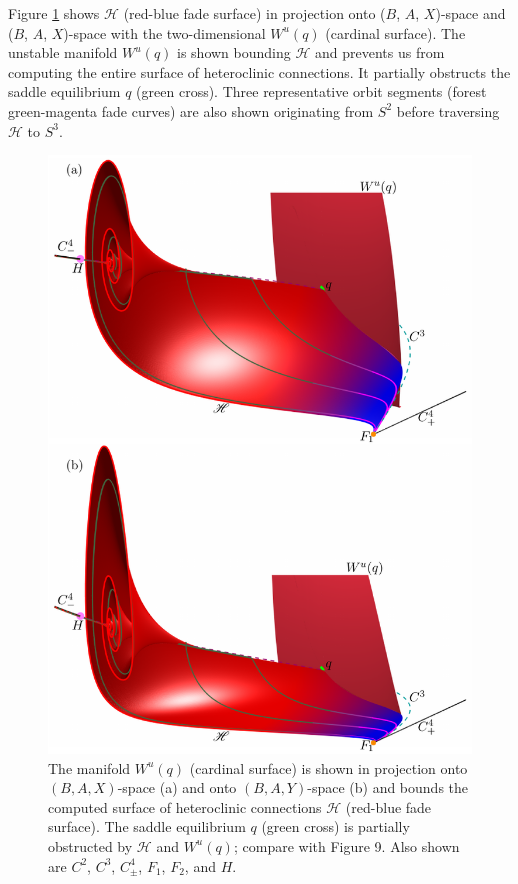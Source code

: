\documentclass{ws-ijbc}
\begin{document}
Figure \ref{figure_10} shows $\mathscr{H}$ (red-blue fade surface) in projection onto ($B$, $A$, $X$)-space and ($B$, $A$, $X$)-space with the two-dimensional $W^u(q)$ (cardinal surface).  The unstable manifold $W^u(q)$ is shown bounding $\mathscr{H}$ and prevents us from computing the entire surface of heteroclinic connections.  It partially obstructs the saddle equilibrium $q$ (green cross).  Three representative orbit segments (forest green-magenta fade curves) are also shown originating from $S^2$ before traversing $\mathscr{H}$ to $S^3$.

\begin{figure}[H]
\centering
\includegraphics[]{./figures/MKMO_10.pdf}
\caption{The manifold $W^u(q)$ (cardinal surface) is shown in projection onto $(B,A,X)$-space (a) and onto $(B,A,Y)$-space (b) and bounds the computed surface of heteroclinic connections $\mathscr{H}$ (red-blue fade surface).  The saddle equilibrium $q$ (green cross) is partially obstructed by $\mathscr{H}$ and $W^{u}(q)$; compare with Figure 9.   Also shown are $C^2$, $C^3$, $C^4_\pm$, $F_1$, $F_2$, and $H$.}
\label{figure_10}
\end{figure}
\end{document}
